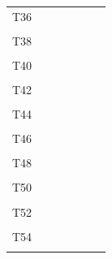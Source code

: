 \documentclass[
]{article}
\begin{document}
\begin{longtable}[l]{lllllll}
\addlinespace
T36 &  &  &  &  &  & \\
\cellcolor{gray!6}{T37} & \cellcolor{gray!6}{} & \cellcolor{gray!6}{} & \cellcolor{gray!6}{} & \cellcolor{gray!6}{} & \cellcolor{gray!6}{} & \cellcolor{gray!6}{}\\
T38 &  &  &  &  &  & \\
\cellcolor{gray!6}{T39} & \cellcolor{gray!6}{} & \cellcolor{gray!6}{} & \cellcolor{gray!6}{} & \cellcolor{gray!6}{} & \cellcolor{gray!6}{} & \cellcolor{gray!6}{}\\
T40 &  &  &  &  &  & \\
\addlinespace
\cellcolor{gray!6}{T41} & \cellcolor{gray!6}{} & \cellcolor{gray!6}{} & \cellcolor{gray!6}{} & \cellcolor{gray!6}{} & \cellcolor{gray!6}{} & \cellcolor{gray!6}{}\\
T42 &  &  &  &  &  & \\
\cellcolor{gray!6}{T43} & \cellcolor{gray!6}{} & \cellcolor{gray!6}{} & \cellcolor{gray!6}{} & \cellcolor{gray!6}{} & \cellcolor{gray!6}{} & \cellcolor{gray!6}{}\\
T44 &  &  &  &  &  & \\
\cellcolor{gray!6}{T45} & \cellcolor{gray!6}{} & \cellcolor{gray!6}{} & \cellcolor{gray!6}{} & \cellcolor{gray!6}{} & \cellcolor{gray!6}{} & \cellcolor{gray!6}{}\\
\addlinespace
T46 &  &  &  &  &  & \\
\cellcolor{gray!6}{T47} & \cellcolor{gray!6}{} & \cellcolor{gray!6}{} & \cellcolor{gray!6}{} & \cellcolor{gray!6}{} & \cellcolor{gray!6}{} & \cellcolor{gray!6}{}\\
T48 &  &  &  &  &  & \\
\cellcolor{gray!6}{T49} & \cellcolor{gray!6}{} & \cellcolor{gray!6}{} & \cellcolor{gray!6}{} & \cellcolor{gray!6}{} & \cellcolor{gray!6}{} & \cellcolor{gray!6}{}\\
T50 &  &  &  &  &  & \\
\addlinespace
\cellcolor{gray!6}{T51} & \cellcolor{gray!6}{} & \cellcolor{gray!6}{} & \cellcolor{gray!6}{} & \cellcolor{gray!6}{} & \cellcolor{gray!6}{} & \cellcolor{gray!6}{}\\
T52 &  &  &  &  &  & \\
\cellcolor{gray!6}{T53} & \cellcolor{gray!6}{} & \cellcolor{gray!6}{} & \cellcolor{gray!6}{} & \cellcolor{gray!6}{} & \cellcolor{gray!6}{} & \cellcolor{gray!6}{}\\
T54 &  &  &  &  &  & \\
\cellcolor{gray!6}{T55} & \cellcolor{gray!6}{} & \cellcolor{gray!6}{} & \cellcolor{gray!6}{} & \cellcolor{gray!6}{} & \cellcolor{gray!6}{} & \cellcolor{gray!6}{}\\

\end{longtable}
\end{document}
